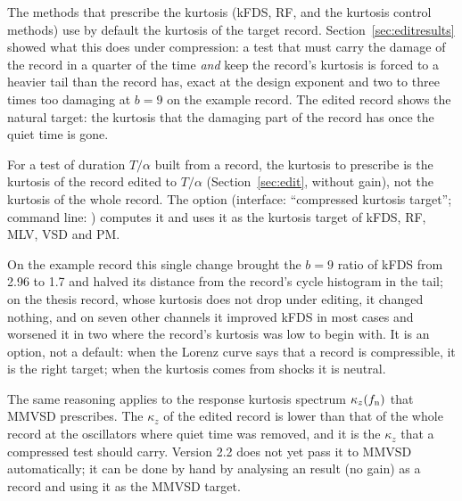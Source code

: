 The methods that prescribe the kurtosis (kFDS, RF, and the kurtosis control methods) use by default
the kurtosis of the target record. Section~\ref{sec:editresults} showed what this does under
compression: a test that must carry the damage of the record in a quarter of the time \emph{and} keep
the record's kurtosis is forced to a heavier tail than the record has, exact at the design exponent
and two to three times too damaging at $b = 9$ on the example record. The edited record shows the
natural target: the kurtosis that the damaging part of the record has once the quiet time is gone.

\begin{result}
For a test of duration $T/\alpha$ built from a record, the kurtosis to prescribe is the kurtosis of the
record edited to $T/\alpha$ (Section~\ref{sec:edit}, without gain), not the kurtosis of the whole
record. The option  (interface: ``compressed kurtosis target''; command line:
) computes it and uses it as the kurtosis target of kFDS, RF, MLV, VSD and PM.
\end{result}

On the example record this single change brought the $b = 9$ ratio of kFDS from 2.96 to 1.7 and
halved its distance from the record's cycle histogram in the tail; on the thesis record, whose kurtosis
does not drop under editing, it changed nothing, and on seven other channels it improved kFDS in most
cases and worsened it in two where the record's kurtosis was low to begin with. It is an option, not a
default: when the Lorenz curve says that a record is compressible, it is the right target; when the
kurtosis comes from shocks it is neutral.

The same reasoning applies to the response kurtosis spectrum $\kappa_z(f_{\mathrm{n}})$ that MMVSD prescribes.
The $\kappa_z$ of the edited record is lower than that of the whole record at the oscillators where
quiet time was removed, and it is the $\kappa_z$ that a compressed test should carry. Version 2.2 does
not yet pass it to MMVSD automatically; it can be done by hand by analysing an  result (no
gain) as a record and using it as the MMVSD target.
